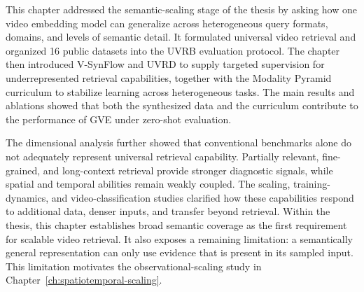 This chapter addressed the semantic-scaling stage of the thesis by asking how one video embedding model can generalize across heterogeneous query formats, domains, and levels of semantic detail. It formulated universal video retrieval and organized 16 public datasets into the UVRB evaluation protocol. The chapter then introduced V-SynFlow and UVRD to supply targeted supervision for underrepresented retrieval capabilities, together with the Modality Pyramid curriculum to stabilize learning across heterogeneous tasks. The main results and ablations showed that both the synthesized data and the curriculum contribute to the performance of GVE under zero-shot evaluation.

The dimensional analysis further showed that conventional benchmarks alone do not adequately represent universal retrieval capability. Partially relevant, fine-grained, and long-context retrieval provide stronger diagnostic signals, while spatial and temporal abilities remain weakly coupled. The scaling, training-dynamics, and video-classification studies clarified how these capabilities respond to additional data, denser inputs, and transfer beyond retrieval. Within the thesis, this chapter establishes broad semantic coverage as the first requirement for scalable video retrieval. It also exposes a remaining limitation: a semantically general representation can only use evidence that is present in its sampled input. This limitation motivates the observational-scaling study in Chapter~\ref{ch:spatiotemporal-scaling}.
